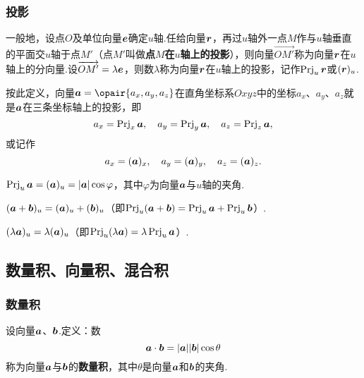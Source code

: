 \subsubsection{投影}
\begin{definition}
一般地，设点\(O\)及单位向量\(\boldsymbol{e}\)确定\(u\)轴.任给向量\(\boldsymbol{r}\)，再过\(u\)轴外一点\(M\)作与\(u\)轴垂直的平面交\(u\)轴于点\(M'\)（点\(M'\)叫做\textbf{点\(M\)在\(u\)轴上的投影}），则向量\(\vec{OM'}\)称为向量\(\boldsymbol{r}\)在\(u\)轴上的分向量.设\(\overrightarrow{OM'}=\lambda\boldsymbol{e}\)，则数\(\lambda\)称为向量\(\boldsymbol{r}\)在\(u\)轴上的投影，记作\(\operatorname{Prj}_u \boldsymbol{r}\)或\((\boldsymbol{r})_u\).
\end{definition}
按此定义，向量\(\mat{a}=\opair{a_x,a_y,a_z}\)在直角坐标系\(Oxyz\)中的坐标\(a_x\)、\(a_y\)、\(a_z\)就是\(\boldsymbol{a}\)在三条坐标轴上的投影，即\[
a_x = \operatorname{Prj}_x\boldsymbol{a},
\quad
a_y = \operatorname{Prj}_y\boldsymbol{a},
\quad
a_z = \operatorname{Prj}_z\boldsymbol{a},
\]或记作\[
a_x = (\boldsymbol{a})_x,
\quad
a_y = (\boldsymbol{a})_y,
\quad
a_z = (\boldsymbol{a})_z.
\]

\begin{property}
\(\operatorname{Prj}_u\boldsymbol{a} = (\boldsymbol{a})_u = \abs{\boldsymbol{a}} \cos\varphi\)，其中\(\varphi\)为向量\(\boldsymbol{a}\)与\(u\)轴的夹角.
\end{property}

\begin{property}
\((\boldsymbol{a}+\boldsymbol{b})_u = (\boldsymbol{a})_u + (\boldsymbol{b})_u\)（即\(\operatorname{Prj}_u(\boldsymbol{a}+\boldsymbol{b}) = \operatorname{Prj}_u\boldsymbol{a} + \operatorname{Prj}_u\boldsymbol{b}\)）.
\end{property}

\begin{property}
\((\lambda\boldsymbol{a})_u = \lambda(\boldsymbol{a})_u\)（即\(\operatorname{Prj}_u(\lambda\boldsymbol{a}) = \lambda \operatorname{Prj}_u\boldsymbol{a}\)）.
\end{property}

\subsection{数量积、向量积、混合积}
\subsubsection{数量积}
\begin{definition}
设向量\(\boldsymbol{a}\)、\(\boldsymbol{b}\).定义：数\begin{equation}
\boldsymbol{a}\cdot\boldsymbol{b} = \abs{\boldsymbol{a}}\abs{\boldsymbol{b}}\cos\theta
\end{equation}称为向量\(\boldsymbol{a}\)与\(\boldsymbol{b}\)的\textbf{数量积}，其中\(\theta\)是向量\(\boldsymbol{a}\)和\(\boldsymbol{b}\)的夹角.
\end{definition}

